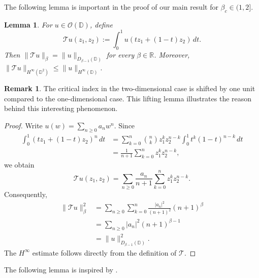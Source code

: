 \documentclass[a4paper,12pt]{amsart}
\newtheorem{lem}[thm]{Lemma}
\theoremstyle{definition}
\newtheorem{rem}[thm]{Remark}
\begin{document}
The following lemma is important in the proof of our main result for $\beta_c\in(1,2].$
\begin{lem}\label{lem:diagonal-lifting}
For $u\in\mathcal O(\mathbb D)$, define
\[
    \mathcal Tu(z_1,z_2)
    :=\int_0^1u(tz_1+(1-t)z_2)\,dt.
\]
Then
$
    \|\mathcal Tu\|_\beta
    =\|u\|_{D_{\beta-1}(\mathbb D)}
$
for every $\beta\in\mathbb R$. Moreover,
$
    \|\mathcal Tu\|_{H^\infty(\mathbb D^2)}
    \leq\|u\|_{H^\infty(\mathbb D)}.
$
\end{lem}
\begin{rem} The critical index in the two-dimensional case is shifted by one unit compared to the one-dimensional case. This lifting lemma illustrates the reason behind this interesting phenomenon.
\end{rem}
\begin{proof}
Write $u(w)=\sum_{n\geq0}a_nw^n$. Since
\[
\begin{aligned}
    \int_0^1(tz_1+(1-t)z_2)^n\,dt
    &=\sum_{k=0}^n\binom nk z_1^kz_2^{n-k}
      \int_0^1t^k(1-t)^{n-k}\,dt \\
    &=\frac{1}{n+1}\sum_{k=0}^nz_1^kz_2^{n-k},
\end{aligned}
\]
we obtain
\[
    \mathcal Tu(z_1,z_2)
    =\sum_{n\geq0}\frac{a_n}{n+1}
      \sum_{k=0}^nz_1^kz_2^{n-k}.
\]
Consequently,
\[
\begin{aligned}
    \|\mathcal Tu\|_\beta^2
    &=\sum_{n\geq0}\sum_{k=0}^n
      \frac{|a_n|^2}{(n+1)^2}(n+1)^\beta \\
    &=\sum_{n\geq0}|a_n|^2(n+1)^{\beta-1}\\
    &=\|u\|_{D_{\beta-1}(\mathbb D)}^2.
\end{aligned}
\]
The $H^\infty$ estimate follows directly from the definition of
$\mathcal T$.
\end{proof}

The following lemma is inspired by \cite[Lemma~9.3.6]{ElFallah2014_book}.
\end{document}
